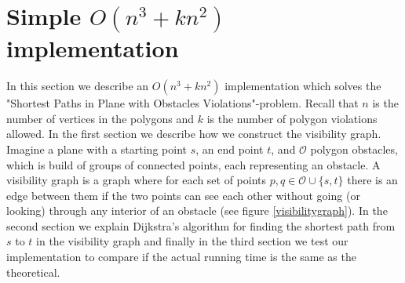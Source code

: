 \chapter{Simple $O(n^3 +k n^2)$ implementation}
In this section we describe an $O(n^3+k n^2)$ implementation which solves the
"Shortest Paths in Plane with Obstacles Violations"-problem. Recall that $n$ is
the number of vertices in the polygons and $k$ is the number of polygon
violations allowed. In the first section we describe how we construct the
visibility graph. Imagine a plane with a starting point $s$, an end point $t$,
and $\mathcal{O}$ polygon obstacles, which is build of groups of connected points,
each representing an obstacle. A visibility graph is a graph where for each set of
points $p,q\in \mathcal{O} \cup \{s,t\}$  there is an edge between them if the 
two points can see each other
without going (or looking) through any interior of an obstacle (see figure
\ref{visibilitygraph}). In the second section we explain Dijkstra's algorithm
for finding the shortest path from $s$ to $t$ in the visibility graph and
finally in the third section we test our implementation to compare if the actual 
running time is the same as the theoretical.

